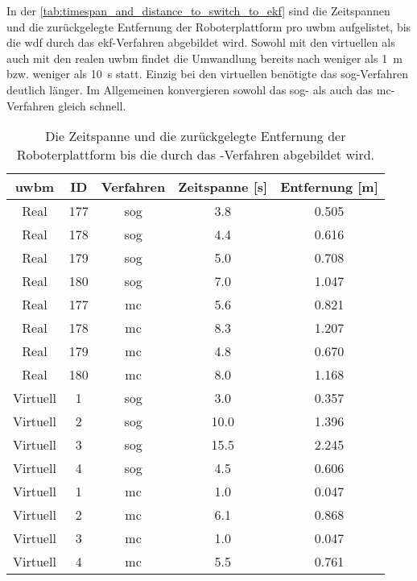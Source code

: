 In der \autoref{tab:timespan_and_distance_to_switch_to_ekf} sind die Zeitspannen und die zurückgelegte Entfernung der Roboterplattform pro \gls{uwbm} aufgelistet, bis die \gls{wdf} durch das \gls{ekf}-Verfahren abgebildet wird. Sowohl mit den virtuellen als auch mit den realen \gls{uwbm} findet die Umwandlung bereits nach weniger als \SI{1}{\meter} bzw. weniger als \SI{10}{\second} statt. Einzig bei den virtuellen  benötigte das \gls{sog}-Verfahren deutlich länger. Im Allgemeinen konvergieren sowohl das \gls{sog}- als auch das \gls{mc}-Verfahren gleich schnell.

\begin{table}
	\centering
	\begin{tabular}{||c|c||c||c|c||}
		\hline
\gls{uwbm} & ID & Verfahren & Zeitspanne [\si{\second}] & Entfernung [\si{\meter}] \\
\hline
Real & \num{177} & \gls{sog} & \num{3.8} & \num{0.505} \\
Real & \num{178} & \gls{sog} & \num{4.4} & \num{0.616} \\
Real & \num{179} & \gls{sog} & \num{5.0} & \num{0.708} \\
Real & \num{180} & \gls{sog} & \num{7.0} & \num{1.047} \\
\hline
\hline
Real & \num{177} & \gls{mc} & \num{5.6} & \num{0.821} \\
Real & \num{178} & \gls{mc} & \num{8.3} & \num{1.207} \\
Real & \num{179} & \gls{mc} & \num{4.8} & \num{0.670} \\
Real & \num{180} & \gls{mc} & \num{8.0} & \num{1.168} \\
\hline
\hline
Virtuell & \num{1} & \gls{sog} & \num{3.0} & \num{0.357} \\
Virtuell & \num{2} & \gls{sog} & \num{10.0} & \num{1.396} \\
Virtuell & \num{3} & \gls{sog} & \num{15.5} & \num{2.245} \\
Virtuell & \num{4} & \gls{sog} & \num{4.5} & \num{0.606} \\
\hline
\hline
Virtuell & \num{1} & \gls{mc} & \num{1.0} & \num{0.047} \\
Virtuell & \num{2} & \gls{mc} & \num{6.1} & \num{0.868} \\
Virtuell & \num{3} & \gls{mc} & \num{1.0} & \num{0.047} \\
Virtuell & \num{4} & \gls{mc} & \num{5.5} & \num{0.761} \\
\hline
	\end{tabular}
	\caption{Die Zeitspanne und die zurückgelegte Entfernung der Roboterplattform bis die  durch das -Verfahren abgebildet wird.}
	\label{tab:timespan_and_distance_to_switch_to_ekf}
\end{table}
